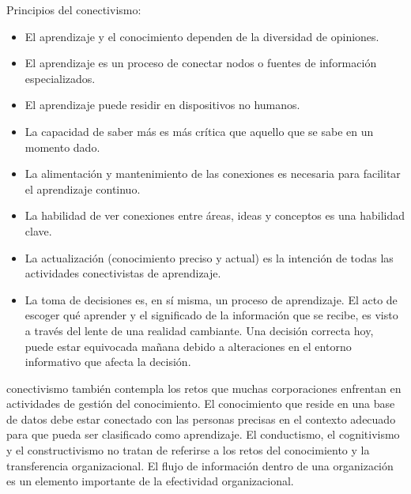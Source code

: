 Principios del conectivismo:
\begin{itemize}
 \item El aprendizaje y el conocimiento dependen de la diversidad de opiniones. 
 \item El aprendizaje es un proceso de conectar nodos o fuentes de informaci\'on especializados.
 \item El aprendizaje puede residir en dispositivos no humanos. 
 \item La capacidad de saber m\'as es m\'as cr\'itica que aquello que se sabe en un momento dado. 
 \item La alimentaci\'on y mantenimiento de las conexiones es necesaria para facilitar el aprendizaje continuo. 
 \item La habilidad de ver conexiones entre \'areas, ideas y conceptos es una habilidad clave. 
 \item La actualizaci\'on (conocimiento preciso y actual) es la intenci\'on de todas las actividades conectivistas de
       aprendizaje. 
 \item La toma de decisiones es, en s\'i misma, un proceso de aprendizaje. El acto de escoger qu\'e aprender y el significado
       de la informaci\'on que se recibe, es visto a trav\'es del lente de una realidad cambiante. Una decisi\'on correcta 
       hoy, puede estar equivocada ma\~nana debido a alteraciones en el entorno informativo que afecta la decisi\'on. 
\end{itemize}

conectivismo tambi\'en contempla los retos que muchas corporaciones enfrentan en actividades de gesti\'on del conocimiento. 
El conocimiento que reside en una base de datos debe estar conectado con las personas precisas en el contexto adecuado para
que pueda ser clasificado como aprendizaje. El conductismo, el cognitivismo y el constructivismo no tratan de referirse a 
los retos del conocimiento y la transferencia organizacional.
El flujo de informaci\'on dentro de una organizaci\'on es un elemento importante de la efectividad organizacional.\\

